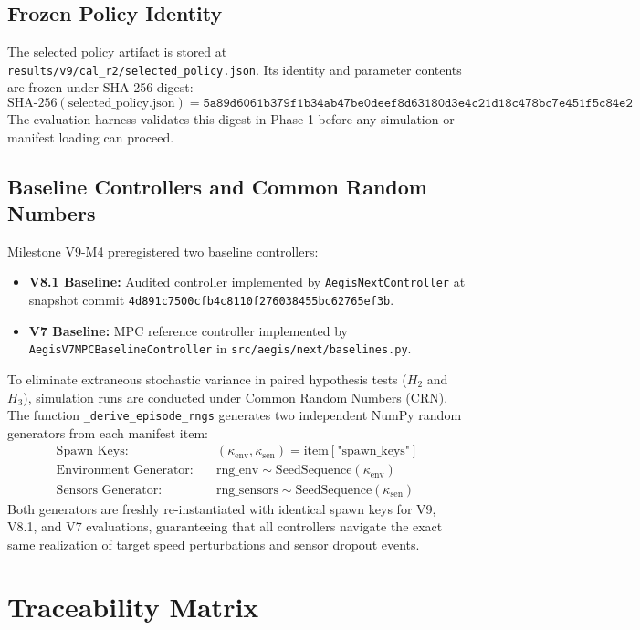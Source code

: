 \documentclass[10pt,a4paper]{article}
\begin{document}
\subsection{Frozen Policy Identity}
The selected policy artifact is stored at \texttt{results/v9/cal\_r2/selected\_policy.json}. Its identity and parameter contents are frozen under SHA-256 digest:
\begin{equation}
\text{SHA-256}(\text{selected\_policy.json}) = \texttt{5a89d6061b379f1b34ab47be0deef8d63180d3e4c21d18c478bc7e451f5c84e2}
\end{equation}
The evaluation harness validates this digest in Phase 1 before any simulation or manifest loading can proceed.

\subsection{Baseline Controllers and Common Random Numbers}
Milestone V9-M4 preregistered two baseline controllers:
\begin{itemize}
    \item \textbf{V8.1 Baseline:} Audited controller implemented by \texttt{AegisNextController} at snapshot commit \texttt{4d891c7500cfb4c8110f276038455bc62765ef3b}.
    \item \textbf{V7 Baseline:} MPC reference controller implemented by \texttt{AegisV7MPCBaselineController} in \texttt{src/aegis/next/baselines.py}.
\end{itemize}
To eliminate extraneous stochastic variance in paired hypothesis tests ($H_2$ and $H_3$), simulation runs are conducted under Common Random Numbers (CRN). The function \texttt{\_derive\_episode\_rngs} generates two independent NumPy random generators from each manifest item:
\begin{align}
    \text{Spawn Keys:} \quad & (\kappa_{\text{env}}, \kappa_{\text{sen}}) = \text{item}[\text{"spawn\_keys"}] \\
    \text{Environment Generator:} \quad & \text{rng\_env} \sim \text{SeedSequence}(\kappa_{\text{env}}) \\
    \text{Sensors Generator:} \quad & \text{rng\_sensors} \sim \text{SeedSequence}(\kappa_{\text{sen}})
\end{align}
Both generators are freshly re-instantiated with identical spawn keys for V9, V8.1, and V7 evaluations, guaranteeing that all controllers navigate the exact same realization of target speed perturbations and sensor dropout events.

\section{Traceability Matrix}
\end{document}
